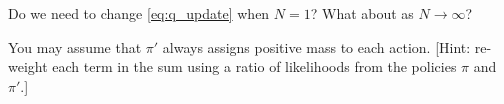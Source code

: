 Do we need to change \eqref{eq:q_update} when $N=1$? What about as $N\to\infty$? 

You may assume that $\pi'$ always assigns positive mass to each action. [Hint: re-weight each term in the sum using a ratio of likelihoods from the policies $\pi$ and $\pi'$.]

 
\ifsolutions\solve\thesubsection\else
\fi

\endgroup
